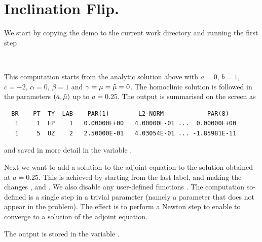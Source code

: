 \documentclass[12pt]{report}
\begin{document}
\section{Inclination Flip.}
We start by copying the demo to the current work directory 
and running the first step
\begin{center}
\\
\end{center}
This computation starts from the analytic solution above with 
$a=0$, $b=1$, $c=-2$, $\alpha=0$, $\beta=1$ and 
$\gamma = \mu=\tilde \mu =0$. The homoclinic solution is followed in the
parameters $(a,\tilde \mu)$  up to $a=0.25$. 
The output is summarised on the screen as
\begin{verbatim}
  BR    PT  TY  LAB    PAR(1)        L2-NORM            PAR(8)     
   1     1  EP    1   0.00000E+00   4.00000E-01 ...  0.00000E+00
   1     5  UZ    2   2.50000E-01   4.03054E-01 ... -1.85981E-11
\end{verbatim}
and saved in more detail in the \python variable .

Next we want to add a solution to the adjoint equation to the
solution obtained at $a=0.25$. This is
achieved by starting from the last label, and making the changes
,  and . We also disable any
user-defined functions . The computation so-defined 
is a single step in a trivial parameter  (namely a parameter
that does not appear in the problem). The effect is to perform a Newton
step to enable \AUTO to converge to a solution of the adjoint equation.
\begin{center}
\end{center} 
The output is stored in the \python variable .
\end{document}
